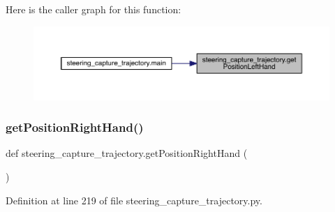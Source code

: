 Here is the caller graph for this function\+:\nopagebreak
\begin{figure}[H]
\begin{center}
\leavevmode
\includegraphics[width=350pt]{namespacesteering__capture__trajectory_a0997cf216eac9c4faad98f7ec77d90b2_icgraph}
\end{center}
\end{figure}
\mbox{\label{namespacesteering__capture__trajectory_aef42b4c4dfb5a6a191011fd3ba71f79d}} 
\subsubsection{\texorpdfstring{getPositionRightHand()}{getPositionRightHand()}}
{\footnotesize\ttfamily def steering\+\_\+capture\+\_\+trajectory.\+get\+Position\+Right\+Hand (\begin{DoxyParamCaption}{ }\end{DoxyParamCaption})}



Definition at line 219 of file steering\+\_\+capture\+\_\+trajectory.\+py.


